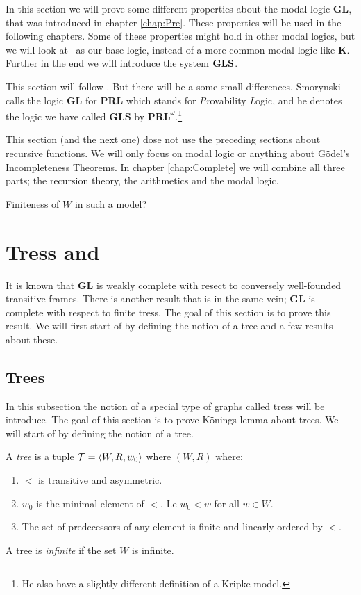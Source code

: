 \documentclass[../main.tex]{subfiles}
\begin{document}
In this section we will prove some different properties about the modal logic
\textbf{GL}, that was introduced in chapter \ref{chap:Pre}.
These properties will be used in the following chapters. Some of these properties might
hold in other modal logics, but we will look at \GL\ as our base logic,
instead of a more common modal logic like \textbf{K}.
Further in the end we will introduce the system $\text{\textbf{GLS}}$.

This section will follow \cite{Smor1985}. But there will be a some small
differences. Smorynski calls the logic \textbf{GL} for \textbf{PRL} which
stands for \textit{Pr}ovability \textit{L}ogic, and he denotes the logic we
have called \textbf{GLS} by $\textbf{PRL}^\omega$.\footnote{He also have a
slightly different definition of a Kripke model.}

This section (and the next one) dose not use the preceding sections about recursive functions. We will only
focus on modal logic or anything about Gödel's Incompleteness Theorems. In
chapter \ref{chap:Complete} we will combine all three parts; the recursion
theory, the arithmetics and the modal logic.


Finiteness of $W$ in such a model?
\section{Tress and \GL}

It is known that \textbf{GL} is weakly complete with resect to conversely
well-founded transitive frames. There is another result that is in the same
vein; \textbf{GL} is complete with respect to finite tress. The goal of this
section is to prove this result. We will first start of by defining the notion
of a tree and a few results about these.

\subsection{Trees}
In this subsection the notion of a special type of graphs called tress will be
introduce. The goal of this section is to prove Könings lemma about trees. We
will start of by defining the notion of a tree.
\begin{defi}
	A \textit{tree} is a tuple $\mathcal{T}=\langle W,R,w_0\rangle$ where $(W,R)$ where:
	\begin{enumerate}
		\item $<$ is transitive and asymmetric.
		\item $w_0$ is the minimal element of $<$. I.e $w_0
			<w$ for all $w\in W$.
		\item The set of predecessors of any element is finite and
			linearly ordered by $<$.
	\end{enumerate}
	A tree is \textit{infinite} if the set $W$ is infinite.
\end{defi}
\end{document}
